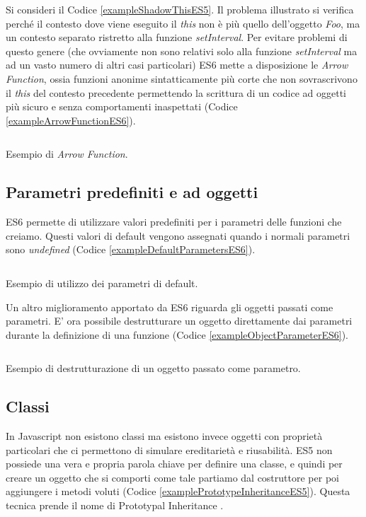 \noindent
Si consideri il Codice \ref{exampleShadowThisES5}. Il problema illustrato si verifica perché il contesto dove viene eseguito il \textit{this} non è più quello dell'oggetto \textit{Foo}, ma un contesto separato ristretto alla funzione \textit{setInterval}. Per evitare problemi di questo genere (che ovviamente non sono relativi solo alla funzione \textit{setInterval} ma ad un vasto numero di altri casi particolari) ES6 mette a disposizione le \textit{Arrow Function}, ossia funzioni anonime sintatticamente più corte che non sovrascrivono il \textit{this} del contesto precedente permettendo la scrittura di un codice ad oggetti più sicuro e senza comportamenti inaspettati (Codice \ref{exampleArrowFunctionES6}).

\begin{listing}[ht]
\inputminted{Javascript}{sources/exampleArrowFunctionES6.js}
\caption{Esempio di \textit{Arrow Function}.}
\label{exampleArrowFunctionES6}
\end{listing} 

\subsection{Parametri predefiniti e ad oggetti}
ES6 permette di utilizzare valori predefiniti per i parametri delle funzioni che creiamo. Questi valori di default vengono assegnati quando i normali parametri sono \textit{undefined} (Codice \ref{exampleDefaultParametersES6}). 

\begin{listing}[ht]
\inputminted{Javascript}{sources/exampleDefaultParametersES6.js}
\caption{Esempio di utilizzo dei parametri di default.}
\label{exampleDefaultParametersES6}
\end{listing}

\noindent
Un altro miglioramento apportato da ES6 riguarda gli oggetti passati come parametri. E' ora possibile destrutturare un oggetto direttamente dai parametri durante la definizione di una funzione (Codice \ref{exampleObjectParameterES6}).

\begin{listing}[ht]
\inputminted{Javascript}{sources/exampleObjectParameterES6.js}
\caption{Esempio di destrutturazione di un oggetto passato come parametro.}
\label{exampleObjectParameterES6}
\end{listing}

\subsection{Classi}
In Javascript non esistono classi ma esistono invece oggetti con proprietà particolari che ci permettono di simulare ereditarietà e riusabilità. ES5 non possiede una vera e propria parola chiave per definire una classe, e quindi per creare un oggetto che si comporti come tale partiamo dal costruttore per poi aggiungere i metodi voluti (Codice \ref{examplePrototypeInheritanceES5}). Questa tecnica prende il nome di Prototypal Inheritance \cite{RylanOnPrototypeInheritance}.

